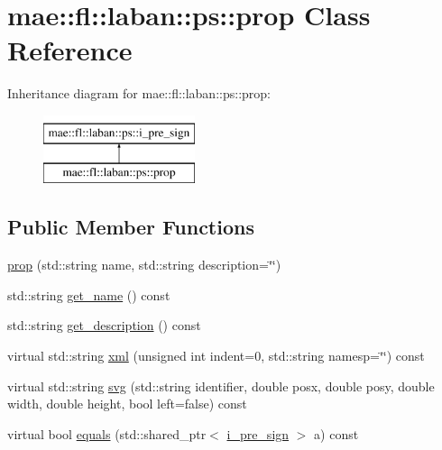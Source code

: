 \hypertarget{classmae_1_1fl_1_1laban_1_1ps_1_1prop}{\section{mae\-:\-:fl\-:\-:laban\-:\-:ps\-:\-:prop Class Reference}
\label{classmae_1_1fl_1_1laban_1_1ps_1_1prop}
}
Inheritance diagram for mae\-:\-:fl\-:\-:laban\-:\-:ps\-:\-:prop\-:\begin{figure}[H]
\begin{center}
\leavevmode
\includegraphics[height=2.000000cm]{classmae_1_1fl_1_1laban_1_1ps_1_1prop}
\end{center}
\end{figure}
\subsection*{Public Member Functions}
\begin{DoxyCompactItemize}
\item 
\hyperlink{classmae_1_1fl_1_1laban_1_1ps_1_1prop_aa718f11fd36340cdaa1838989b3a1ebf}{prop} (std\-::string name, std\-::string description=\char`\"{}\char`\"{})
\item 
std\-::string \hyperlink{classmae_1_1fl_1_1laban_1_1ps_1_1prop_a369d172ed15a16f5d6ef3d442056987f}{get\-\_\-name} () const 
\item 
std\-::string \hyperlink{classmae_1_1fl_1_1laban_1_1ps_1_1prop_aa9f90e69ede9253c8bb1cddba6799843}{get\-\_\-description} () const 
\item 
virtual std\-::string \hyperlink{classmae_1_1fl_1_1laban_1_1ps_1_1prop_a075d19bb27eeb7cc4d1af8a5294a3507}{xml} (unsigned int indent=0, std\-::string namesp=\char`\"{}\char`\"{}) const 
\item 
virtual std\-::string \hyperlink{classmae_1_1fl_1_1laban_1_1ps_1_1prop_ae0439113058f4ed15bc3826f3e93e6d9}{svg} (std\-::string identifier, double posx, double posy, double width, double height, bool left=false) const 
\item 
virtual bool \hyperlink{classmae_1_1fl_1_1laban_1_1ps_1_1prop_a03b8c4bfa1731767fe0c868555c17c1b}{equals} (std\-::shared\-\_\-ptr$<$ \hyperlink{classmae_1_1fl_1_1laban_1_1ps_1_1i__pre__sign}{i\-\_\-pre\-\_\-sign} $>$ a) const 
\end{DoxyCompactItemize}


